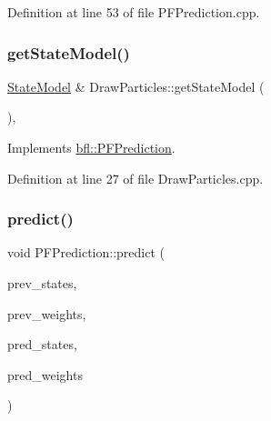 Definition at line 53 of file P\+F\+Prediction.\+cpp.

\mbox{\label{classbfl_1_1DrawParticles_a7a7ebf5a7ea10747db1bd8ab03390107}} 
\subsubsection{\texorpdfstring{get\+State\+Model()}{getStateModel()}}
{\footnotesize\ttfamily \mbox{\hyperlink{classbfl_1_1StateModel}{State\+Model}} \& Draw\+Particles\+::get\+State\+Model (\begin{DoxyParamCaption}{ }\end{DoxyParamCaption})\hspace{0.3cm}{\ttfamily [override]}, {\ttfamily [virtual]}}



Implements \mbox{\hyperlink{classbfl_1_1PFPrediction_a1a0f7a1d66a6849c2de10459c6b8f8ac}{bfl\+::\+P\+F\+Prediction}}.



Definition at line 27 of file Draw\+Particles.\+cpp.

\mbox{\label{classbfl_1_1PFPrediction_a54986f12509d3d997232c4e926420c90}} 
\subsubsection{\texorpdfstring{predict()}{predict()}}
{\footnotesize\ttfamily void P\+F\+Prediction\+::predict (\begin{DoxyParamCaption}\item[{const Eigen\+::\+Ref$<$ const Eigen\+::\+Matrix\+Xf $>$ \&}]{prev\+\_\+states,  }\item[{const Eigen\+::\+Ref$<$ const Eigen\+::\+Vector\+Xf $>$ \&}]{prev\+\_\+weights,  }\item[{Eigen\+::\+Ref$<$ Eigen\+::\+Matrix\+Xf $>$}]{pred\+\_\+states,  }\item[{Eigen\+::\+Ref$<$ Eigen\+::\+Vector\+Xf $>$}]{pred\+\_\+weights }\end{DoxyParamCaption})\hspace{0.3cm}{\ttfamily [inherited]}}



